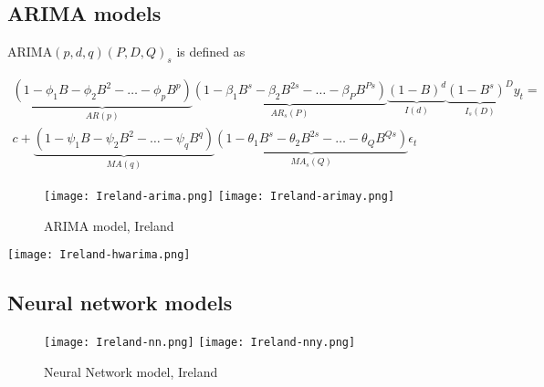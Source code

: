 \subsection{ARIMA models}

ARIMA$(p,d,q)(P,D,Q)_s$  is defined as 

\begin{align}
\underbrace{\left(1-\phi_1 B-\phi_2B^2-\dots-\phi_p B^p\right)}_{AR(p)}
\underbrace{\left(1-\beta_1 B^s-\beta_2B^{2s}-\dots-\beta_P B^{Ps}\right)}_{AR_s(P)} 
\underbrace{\left(1-B\right)^d}_{I(d)}\underbrace{\left(1-B^s\right)^D}_{I_s(D)}   y_t = \nonumber \\
 c+
\underbrace{\left(1-\psi_1 B-\psi_2B^2-\dots-\psi_q B^q\right)}_{MA(q)}
\underbrace{\left(1-\theta_1 B^s-\theta_2B^{2s}-\dots-\theta_Q B^{Qs}\right)}_{MA_s(Q)} \epsilon_t
\end{align}



\begin{figure}[h]
  \texttt{[image: Ireland-arima.png]} \label{fig:ireland-arima}
\endminipage\hfill
{}
  \texttt{[image: Ireland-arimay.png]} \label{fig:ireland-arimay}
\endminipage
\caption{ARIMA model, Ireland}
\end{figure}

\texttt{[image: Ireland-hwarima.png]}


\subsection{Neural network models}

\begin{figure}[h]
  \texttt{[image: Ireland-nn.png]} \label{fig:ireland-nn}
\endminipage\hfill
{}
  \texttt{[image: Ireland-nny.png]} \label{fig:ireland-nny}
\endminipage
\caption{Neural Network model, Ireland}
\end{figure}
